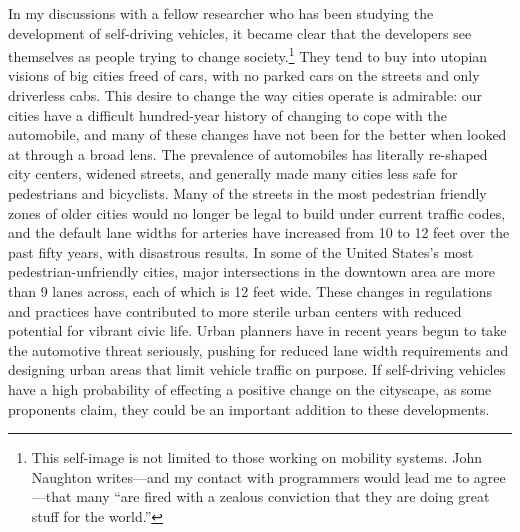 In my discussions with a fellow researcher who has been studying the
development of self-driving vehicles, it became clear that the
developers see themselves as people trying to change
society.\footnote{This self-image is not limited to those working on
  mobility systems. John Naughton writes---and my contact with
  programmers would lead me to agree---that many ``are fired with a zealous
  conviction that they are doing great stuff for the
  world.''\cite{http://www.theguardian.com/commentisfree/2015/feb/22/google-tech-elite-living-in-a-parallel-universe-john-naughton}}
They
tend to buy into utopian visions of big cities freed of cars, with no
parked cars on the streets and only driverless cabs. This desire to
change the way cities operate is admirable: our cities have a
difficult hundred-year history of changing to cope with the
automobile, and many of these changes have not been for the better
when looked at through a broad lens. The prevalence of automobiles has
literally re-shaped city centers,\cite{???-kemp} widened
streets,\cite{???-kemp} and generally made many cities less safe for
pedestrians and bicyclists. Many of the streets in the most pedestrian
friendly zones of older cities would no longer be legal to build under
current traffic codes, and the default lane widths for arteries have increased
from 10 to 12 feet over the past fifty years, with disastrous results.\cite{???-http://www.citylab.com/design/2014/10/why-12-foot-traffic-lanes-are-disastrous-for-safety-and-must-be-replaced-now/381117/} In some of the
United States's most pedestrian-unfriendly cities, major intersections
in the downtown area are more than 9 lanes across, each of which is 12
feet wide. These changes in 
regulations and practices have contributed to more sterile urban
centers with reduced potential for vibrant civic life. Urban planners have
in recent years begun to take the automotive threat seriously, pushing
for reduced lane width requirements and designing urban areas that
limit vehicle traffic on purpose.\cite{???-kemp} If self-driving
vehicles have a high probability of effecting a positive change on the
cityscape, as some proponents claim, they could be an important
addition to these developments.

